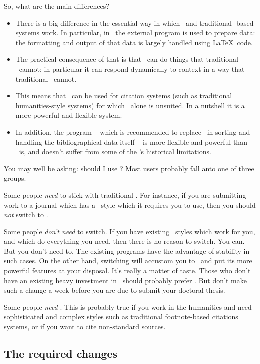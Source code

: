 So, what are the main differences?
\begin{itemize}
\item There is a big difference in the essential way in which \biblatex\ and traditional \bibtex-based systems work. In particular, in \biblatex\ the external program is used to prepare data: the formatting and output of that data is largely handled using \LaTeX\ code.
\item The practical consequence of that is that \biblatex\ can do things that traditional \bibtex\ cannot: in particular it can respond dynamically to context in a way that traditional \bibtex\ cannot.
\item This means that \biblatex\ can be used for citation systems (such as traditional humanities-style systems) for which \bibtex\ alone is unsuited. In a nutshell it is a more powerful and flexible system.
\item In addition, the  program -- which is recommended to replace \bibtex\ in sorting and handling the bibliographical data itself -- is more flexible and powerful than \bibtex\ is, and doesn't suffer from some of the \bibtex's historical limitations.
\end{itemize}

You may well be asking: should I use \biblatex? Most users probably fall anto one of three groups.

Some people \emph{need} to stick with traditional \bibtex. For instance, if you are submitting work to a journal which has a \bibtex\ style which it requires you to use, then you should \emph{not} switch to \biblatex.

Some people \emph{don't need} to switch. If you have existing \bibtex\ styles which work for you, and which do everything you need, then there is no reason to switch. You can. But you don't need to. The existing programs have the advantage of stability in such cases. On the other hand, switching will accustom you to \biblatex\ and put its more powerful features at your disposal. It's really a matter of taste. Those who don't have an existing heavy investment in \bibtex\ should probably prefer \bibtex. But don't make such a change a week before you are due to submit your doctoral thesis.

Some people \emph{need} \biblatex. This is probably true if you work in the humanities and need sophisticated and complex styles such as traditional footnote-based citations systems, or if you want to cite non-standard sources.

\subsection{The required changes}

